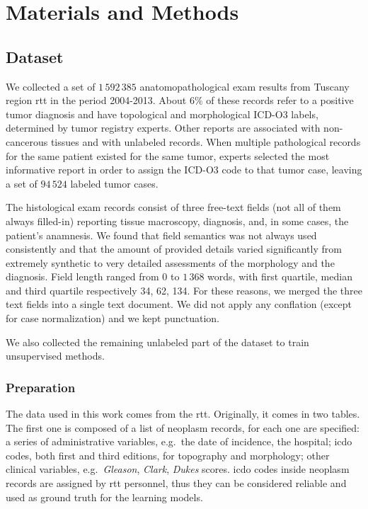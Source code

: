 \chapter{Materials and Methods}

\section{Dataset}
\label{sec:dataset}
We collected a set of $1\,592\,385$ anatomopathological exam results
from Tuscany region \ac{rtt} in the period 2004-2013. About $6\%$
of these records refer to a positive tumor
diagnosis and have topological and morphological ICD-O3 labels,
determined by tumor registry experts. Other reports are associated
with non-cancerous tissues and with unlabeled records. When multiple
pathological records for the
same patient existed for the same tumor, experts selected the most
informative report in order to assign the ICD-O3 code to that tumor
case, leaving a set of $94\,524$ labeled tumor cases.

The histological exam records consist of three free-text fields (not all
of them always filled-in) reporting tissue macroscopy, diagnosis,
and, in some cases, the patient's anamnesis. We found that field
semantics was not always used consistently and that the amount of
provided details varied significantly from extremely synthetic to very
detailed assessments of the morphology and the diagnosis. Field length
ranged from $0$ to $1\,368$ words, with first quartile, median and
third quartile respectively 34, 62, 134. For these reasons, we merged
the three text fields
into a single text document. We did not apply any conflation (except for
case normalization) and we kept punctuation.


We also collected the remaining unlabeled part of the dataset to train
unsupervised methods.

\subsection{Preparation}
The data used in this work comes from the \ac{rtt}. Originally, it
comes in two tables. The first one is composed of
a list of
neoplasm records, for each one are specified: a series of
administrative variables, e.g.\ the date of incidence, the hospital;
\ac{icdo} codes, both first and third editions, for topography and
morphology; other clinical variables, e.g.\ \emph{Gleason},
\emph{Clark}, \emph{Dukes} scores.
\ac{icdo} codes inside neoplasm records are assigned by
\ac{rtt} personnel, thus they can be considered reliable and used as
ground truth for the learning models.

